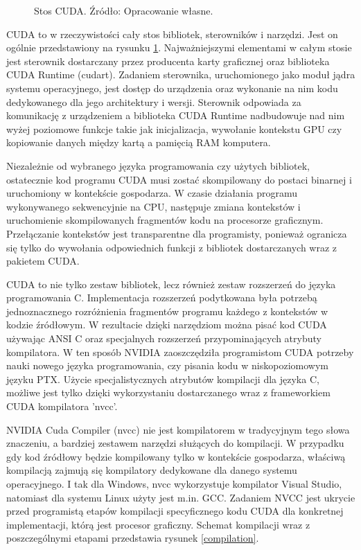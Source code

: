 \begin{figure}[ht]
\centering

\caption{Stos CUDA. Źródło: Opracowanie własne.}
\label{cuda-model}
\end{figure}

CUDA to w rzeczywistości cały stos bibliotek, sterowników i narzędzi. Jest on
ogólnie 
przedstawiony na rysunku \ref{cuda-model}. Najważniejszymi elementami w całym
stosie jest sterownik dostarczany przez producenta karty graficznej
oraz biblioteka CUDA Runtime (cudart). Zadaniem sterownika, uruchomionego
jako moduł jądra systemu operacyjnego, jest dostęp do urządzenia oraz wykonanie
na nim kodu dedykowanego dla jego architektury i wersji. Sterownik odpowiada za
komunikację z urządzeniem a biblioteka CUDA Runtime nadbudowuje nad nim wyżej
poziomowe funkcje takie jak inicjalizacja, wywołanie kontekstu GPU czy
kopiowanie danych między kartą a pamięcią RAM komputera.

Niezależnie od wybranego języka programowania czy użytych bibliotek, ostatecznie kod programu CUDA musi
zostać skompilowany do postaci binarnej i uruchomiony w kontekście gospodarza. W
czasie działania programu wykonywanego sekwencyjnie na CPU, następuje zmiana
kontekstów i uruchomienie skompilowanych fragmentów kodu na procesorze graficznym.
Przełączanie kontekstów jest transparentne dla programisty,
ponieważ ogranicza się tylko do wywołania odpowiednich funkcji z bibliotek
dostarczanych wraz z pakietem CUDA.

CUDA to nie tylko zestaw bibliotek, lecz również zestaw rozszerzeń do języka
programowania C. Implementacja rozszerzeń podytkowana była potrzebą
jednoznacznego rozróżnienia fragmentów programu każdego z kontekstów w kodzie
źródłowym. W rezultacie dzięki narzędziom można pisać kod CUDA używając ANSI C
oraz specjalnych rozszerzeń przypominających atrybuty kompilatora. W ten sposób
NVIDIA zaoszczędziła programistom CUDA potrzeby nauki nowego języka
programowania, czy pisania kodu w niskopoziomowym języku PTX. Użycie
specjalistycznych atrybutów kompilacji dla języka C, możliwe jest tylko dzięki
wykorzystaniu dostarczanego wraz z frameworkiem CUDA kompilatora 'nvcc'.

NVIDIA Cuda Compiler (nvcc) nie jest kompilatorem w tradycyjnym tego słowa
znaczeniu, a bardziej zestawem narzędzi służących do kompilacji. W przypadku gdy
kod źródłowy będzie kompilowany tylko w kontekście gospodarza, właściwą kompilacją
zajmują się kompilatory dedykowane dla danego systemu operacyjnego. I tak dla
Windows, nvcc wykorzystuje kompilator Visual Studio, natomiast dla systemu Linux
użyty jest m.in. GCC. Zadaniem NVCC jest ukrycie przed programistą etapów kompilacji
specyficznego kodu CUDA dla konkretnej implementacji, którą jest procesor
graficzny. Schemat kompilacji wraz z poszczególnymi etapami przedstawia rysunek
\ref{compilation}.

